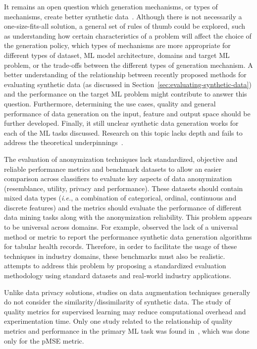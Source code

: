 \documentclass[parskip=full]{scrartcl}
\begin{document}
It remains an open question which generation mechanisms, or types of
mechanisms, create better synthetic data~\cite{cheung2020modals}. Although
there is not necessarily a one-size-fits-all solution, a general set of rules
of thumb could be explored, such as understanding how certain characteristics
of a problem will affect the choice of the generation policy, which types of
mechanisms are more appropriate for different types of dataset, ML model
architecture, domains and target ML problem, or the trade-offs between the
different types of generation mechanism. A better understanding of the
relationship between recently proposed methods for evaluating synthetic data
(as discussed in Section~\ref{sec:evaluating-synthetic-data}) and the
performance on the target ML problem might contribute to answer this question.
Furthermore, determining the use cases, quality and general performance of
data generation on the input, feature and output space should be further
developed. Finally, it still unclear  synthetic data generation
works for each of the ML tasks discussed. Research on this topic lacks depth
and fails to address the theoretical underpinnings~\cite{feng2021survey,
dao2019kernel}.

The evaluation of anonymization techniques lack standardized, objective and
reliable performance metrics and benchmark datasets to allow an easier
comparison across classifiers to evaluate key aspects of data anonymization
(resemblance, utility, privacy and performance). These datasets should contain
mixed data types (\textit{i.e.}, a combination of categorical, ordinal,
continuous and discrete features) and the metrics should evaluate the
performance of different data mining tasks along with the anonymization
reliability. This problem appears to be universal across domains. For example,
\citet{hernandez2022synthetic} observed the lack of a universal method or
metric to report the performance synthetic data generation algorithms for
tabular health records. Therefore, in order to facilitate the usage of these
techniques in industry domains, these benchmarks must also be
realistic. \citet{rosenblatt2020differentially} attempts to address this
problem by proposing a standardized evaluation methodology using standard
datasets and real-world industry applications.

Unlike data privacy solutions, studies on data augmentation techniques
generally do not consider the similarity/dissimilarity of synthetic data. The
study of quality metrics for supervised learning may reduce computational
overhead and experimentation time. Only one study related to the relationship
of quality metrics and performance in the primary ML task was found
in~\cite{dankar2021fake}, which was done only for the pMSE metric.
\end{document}
